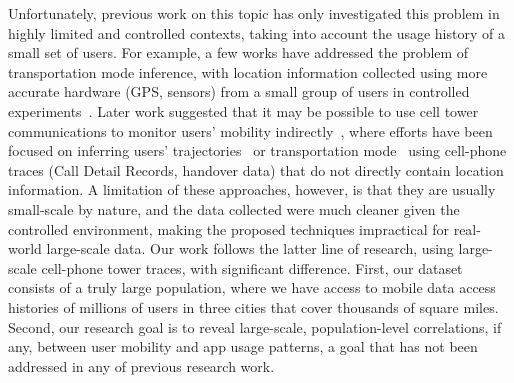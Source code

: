 Unfortunately, previous work on this topic has only investigated this problem in highly limited and controlled contexts,
taking into account the usage history of a small set of users.
For example, a few works have addressed the problem of transportation mode inference,
with location information collected using more accurate 
hardware (\eg GPS, sensors) %
from a small group of users in controlled experiments~\cite{ohashi2014automatic, ryder2009ambulation, zheng2010understanding, biljecki2013transportation, stenneth2011transportation, waga2012detecting, widhalm2012transport, Reddy:2010:UMP:1689239.1689243}.
Later work suggested that it may be possible to use cell tower communications to monitor users' mobility indirectly~\cite{rose2006mobile},
where efforts have been focused on inferring users' trajectories~\cite{Alsolami2012Auth,jiang2013review}
or transportation mode~\cite{wang2010transportation,bekhor2015investigation} using cell-phone traces
(\eg Call Detail Records, handover data) that do not directly contain location information. 
A limitation of these approaches, however, is that they are usually small-scale by nature, and the 
data collected were much cleaner 
given the controlled environment, making the proposed techniques impractical  for real-world large-scale data. 
Our work follows the latter line of research, using large-scale cell-phone tower traces, with significant difference. 
First, our dataset consists of a truly large population,
where we have access to mobile data access histories of millions of users in three cities that cover thousands of square miles.
Second, %
our research goal is to reveal large-scale, population-level correlations,
if any, between user mobility and app usage patterns,
a goal that has not been addressed in any of previous research work.

